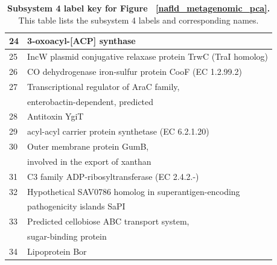 \begin{table}[!ht]
\begin{tabular}{|l|l|}
24 & 3-oxoacyl-[ACP] synthase \\ \hline
25 & IncW plasmid conjugative relaxase protein TrwC (TraI homolog) \\ \hline
26 & CO dehydrogenase iron-sulfur protein CooF (EC 1.2.99.2) \\ \hline
27 & Transcriptional regulator of AraC family, \\
& enterobactin-dependent, predicted \\ \hline
28 & Antitoxin YgiT \\ \hline
29 & acyl-acyl carrier protein synthetase (EC 6.2.1.20) \\ \hline
30 & Outer membrane protein GumB, \\
& involved in the export of xanthan \\ \hline
31 & C3 family ADP-ribosyltransferase (EC 2.4.2.-) \\ \hline
32 & Hypothetical SAV0786 homolog in superantigen-encoding \\
& pathogenicity islands SaPI \\ \hline
33 & Predicted cellobiose ABC transport system, \\
& sugar-binding protein \\ \hline
34 & Lipoprotein Bor \\ \hline
\end{tabular}
\caption[Subsystem 4 label key for Figure ~\ref{nafld_metagenomic_pca}.]{ \textbf{Subsystem 4 label key for Figure ~\ref{nafld_metagenomic_pca}.} This table lists the subsystem 4 labels and corresponding names.}
\label{nafld_subsys4_labels}
\end{table}

